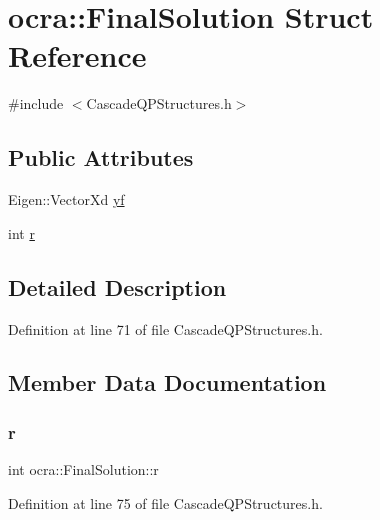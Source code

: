 \hypertarget{structocra_1_1FinalSolution}{}\section{ocra\+:\+:Final\+Solution Struct Reference}
\label{structocra_1_1FinalSolution}


{\ttfamily \#include $<$Cascade\+Q\+P\+Structures.\+h$>$}

\subsection*{Public Attributes}
\begin{DoxyCompactItemize}
\item 
Eigen\+::\+Vector\+Xd \hyperlink{structocra_1_1FinalSolution_a10e9bf5b4c17125d9f3b8b807c627347}{yf}
\item 
int \hyperlink{structocra_1_1FinalSolution_a5d1585ffcc8f9352521c2607a4c119a3}{r}
\end{DoxyCompactItemize}


\subsection{Detailed Description}


Definition at line 71 of file Cascade\+Q\+P\+Structures.\+h.



\subsection{Member Data Documentation}
\hypertarget{structocra_1_1FinalSolution_a5d1585ffcc8f9352521c2607a4c119a3}{}\label{structocra_1_1FinalSolution_a5d1585ffcc8f9352521c2607a4c119a3} 
\subsubsection{\texorpdfstring{r}{r}}
{\footnotesize\ttfamily int ocra\+::\+Final\+Solution\+::r}



Definition at line 75 of file Cascade\+Q\+P\+Structures.\+h.

\hypertarget{structocra_1_1FinalSolution_a10e9bf5b4c17125d9f3b8b807c627347}{}\label{structocra_1_1FinalSolution_a10e9bf5b4c17125d9f3b8b807c627347} 
